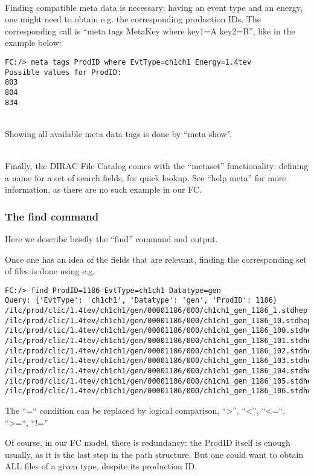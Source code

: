 \documentclass[a4paper,12pt]{article}
\begin{document}
~\\

Finding compatible meta data is necessary: having an event type and an energy,
one might need to obtain e.g. the corresponding production IDs. The
corresponding call is ``meta tags MetaKey where key1=A key2=B'', like in the example below:
\begin{lstlisting}
FC:/> meta tags ProdID where EvtType=ch1ch1 Energy=1.4tev
Possible values for ProdID:
803
804
834
\end{lstlisting}

~\\

Showing all available meta data tags is done by ``meta show''.

~\\

Finally, the DIRAC File Catalog comes with the ``metaset'' functionality: defining a
name for a set of search fields, for quick lookup. See ``help meta'' for more
information, as there are no such example in our FC.

\subsubsection{The find command}\label{sec:find}
Here we describe briefly the ``find'' command and output. 

Once one has an idea of the fields that are relevant, finding the corresponding
set of files is done using e.g.
\begin{lstlisting}
FC:/> find ProdID=1186 EvtType=ch1ch1 Datatype=gen
Query: {'EvtType': 'ch1ch1', 'Datatype': 'gen', 'ProdID': 1186}
/ilc/prod/clic/1.4tev/ch1ch1/gen/00001186/000/ch1ch1_gen_1186_1.stdhep
/ilc/prod/clic/1.4tev/ch1ch1/gen/00001186/000/ch1ch1_gen_1186_10.stdhep
/ilc/prod/clic/1.4tev/ch1ch1/gen/00001186/000/ch1ch1_gen_1186_100.stdhep
/ilc/prod/clic/1.4tev/ch1ch1/gen/00001186/000/ch1ch1_gen_1186_101.stdhep
/ilc/prod/clic/1.4tev/ch1ch1/gen/00001186/000/ch1ch1_gen_1186_102.stdhep
/ilc/prod/clic/1.4tev/ch1ch1/gen/00001186/000/ch1ch1_gen_1186_103.stdhep
/ilc/prod/clic/1.4tev/ch1ch1/gen/00001186/000/ch1ch1_gen_1186_104.stdhep
/ilc/prod/clic/1.4tev/ch1ch1/gen/00001186/000/ch1ch1_gen_1186_105.stdhep
/ilc/prod/clic/1.4tev/ch1ch1/gen/00001186/000/ch1ch1_gen_1186_106.stdhep
\end{lstlisting}

The ``=`` condition can be replaced by logical comparison, ``>'', ``<'', ``<=``,
``>=``, ``!=''

Of course, in our FC model, there is redundancy: the ProdID itself is enough
usually, as it is the last step in the path structure. But one could want to
obtain ALL files of a given type, despite its production ID. 
\end{document}
